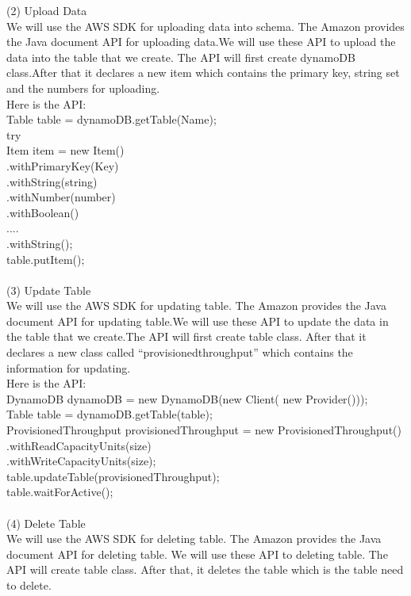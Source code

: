     (2) Upload Data\\
    We will use the AWS SDK for uploading data into schema. The Amazon provides the Java document API for uploading data.We will use these API to upload the data into the table that we create. The API will first create dynamoDB class.After that it declares a new item which contains the primary key, string set and the numbers for uploading.\\
    Here is the API\cite{w1}:\\
    Table table = dynamoDB.getTable(Name);\\
    try \\
    Item item = new Item()\\
                 .withPrimaryKey(Key)\\
                 .withString(string)\\
                 .withNumber(number)\\
                 .withBoolean()\\
                 ....\\
                 .withString();\\
    table.putItem();\\
\\
    (3) Update Table\\
    We will use the AWS SDK for updating table. The Amazon provides the Java document API for updating table.We will use these API to update the data in the table that we create.The API will first create table class. After that it declares a new class called “provisionedthroughput” which contains the information for updating.\\
    Here is the API\cite{w1}:\\
    DynamoDB dynamoDB = new DynamoDB(new Client(
    new Provider()));\\
    Table table = dynamoDB.getTable(table);\\
    ProvisionedThroughput provisionedThroughput = new ProvisionedThroughput()
    .withReadCapacityUnits(size)\\
    .withWriteCapacityUnits(size);\\
    table.updateTable(provisionedThroughput);\\
    table.waitForActive();\\
\\
    (4) Delete Table\\
    We will use the AWS SDK for deleting table. The Amazon provides the Java document API for deleting table. We will use these API to deleting table. The API will create table class. After that, it deletes the table which is the table need to delete.\\
